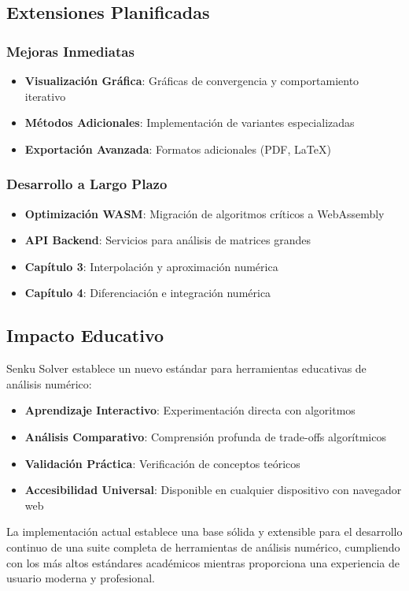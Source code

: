 \subsection{Extensiones Planificadas}

\subsubsection{Mejoras Inmediatas}
\begin{itemize}
    \item \textbf{Visualización Gráfica}: Gráficas de convergencia y comportamiento iterativo
    \item \textbf{Métodos Adicionales}: Implementación de variantes especializadas
    \item \textbf{Exportación Avanzada}: Formatos adicionales (PDF, LaTeX)
\end{itemize}

\subsubsection{Desarrollo a Largo Plazo}
\begin{itemize}
    \item \textbf{Optimización WASM}: Migración de algoritmos críticos a WebAssembly
    \item \textbf{API Backend}: Servicios para análisis de matrices grandes
    \item \textbf{Capítulo 3}: Interpolación y aproximación numérica
    \item \textbf{Capítulo 4}: Diferenciación e integración numérica
\end{itemize}

\subsection{Impacto Educativo}

Senku Solver establece un nuevo estándar para herramientas educativas de análisis numérico:

\begin{itemize}
    \item \textbf{Aprendizaje Interactivo}: Experimentación directa con algoritmos
    \item \textbf{Análisis Comparativo}: Comprensión profunda de trade-offs algorítmicos
    \item \textbf{Validación Práctica}: Verificación de conceptos teóricos
    \item \textbf{Accesibilidad Universal}: Disponible en cualquier dispositivo con navegador web
\end{itemize}

La implementación actual establece una base sólida y extensible para el desarrollo continuo de una suite completa de herramientas de análisis numérico, cumpliendo con los más altos estándares académicos mientras proporciona una experiencia de usuario moderna y profesional.
